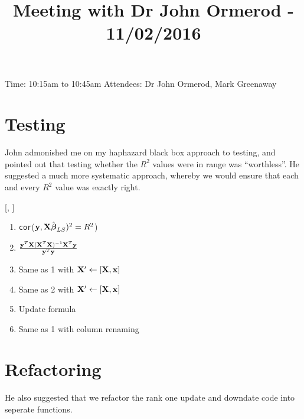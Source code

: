 \documentclass{amsart}
\title{Meeting with Dr John Ormerod - 11/02/2016}
\begin{document}
\maketitle

Time: 10:15am to 10:45am
Attendees: Dr John Ormerod, Mark Greenaway

\section{Testing}

John admonished me on my haphazard black box approach to testing, and pointed out that testing whether
the $R^2$ values were in range was ``worthless''. He suggested a much more systematic approach, whereby we
would ensure that each and every $R^2$ value was exactly right.

[\mX, \vy]
\begin{enumerate}
\item \texttt{cor}(${\bf y}, {\bf X} \hat{{\boldsymbol \beta}}_{LS})^2 = R^2$)  
\item $\frac{{\bf y}^T {\bf X} ({\bf X}^T {\bf X})^{-1} {\bf X}^T {\bf y}}{{\bf y}^T {\bf y}}$
\item Same as 1 with ${\bf X}' \leftarrow [{\bf X}, {\bf x}]$
\item Same as 2 with ${\bf X}' \leftarrow [{\bf X}, {\bf x}]$
\item Update formula
\item Same as 1 with column renaming
\end{enumerate}
\section{Refactoring}

He also suggested that we refactor the rank one update and downdate code into seperate functions.
\end{document}
